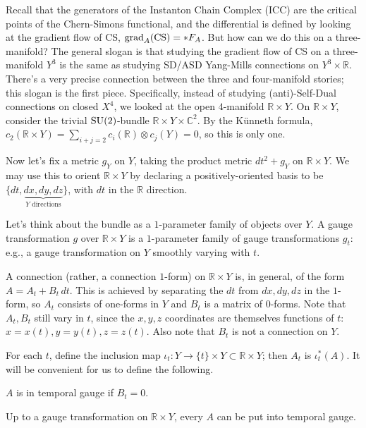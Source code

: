 \documentclass[main]{subfiles}
\begin{document}
Recall that the generators of the Instanton Chain Complex (ICC) are the critical points of the Chern-Simons functional, and the differential is defined by looking at the gradient flow of CS, $\operatorname{grad}_A(\operatorname{CS}) = \ast F_A$. But how can we do this on a three-manifold? The general slogan is that studying the gradient flow of CS on a three-manifold $Y^3$ is the same as studying SD/ASD Yang-Mills connections on $Y^3\times\mathbb{R}$. There's a very precise connection between the three and four-manifold stories; this slogan is the first piece. Specifically, instead of studying (anti)-Self-Dual connections on closed $X^4$, we looked at the open $4$-manifold $\mathbb{R}\times Y$. On $\mathbb{R}\times Y$, consider the trivial $\operatorname{SU}(2)$-bundle $\mathbb{R}\times Y\times \mathbb{C}^2$. By the K\"unneth formula, $c_2(\mathbb{R}\times Y) = \sum_{i+j=2} c_i(\mathbb{R})\otimes c_j(Y) = 0$, so this is only one.

Now let's fix a metric $g_Y$ on $Y$, taking the product metric $dt^2+g_Y$ on $\mathbb{R}\times Y$. We may use this to orient $\mathbb{R}\times Y$ by declaring a positively-oriented basis to be $\{dt,\underbrace{dx,dy,dz}_{Y \text{ directions}}\}$, with $dt$ in the $\mathbb{R}$ direction.

Let's think about the bundle as a $1$-parameter family of objects over $Y$. A gauge transformation $g$ over $\mathbb{R}\times Y$ is a $1$-parameter family of gauge transformations $g_t$: e.g., a gauge transformation on $Y$ smoothly varying with $t$.

A connection (rather, a connection $1$-form) on $\mathbb{R}\times Y$ is, in general, of the form $A = A_t + B_t\, dt$. This is achieved by separating the $dt$ from $dx,dy,dz$ in the $1$-form, so $A_t$ consists of one-forms in $Y$ and $B_t$ is a matrix of $0$-forms. Note that $A_t, B_t$ still vary in $t$, since the $x,y,z$ coordinates are themselves functions of $t$: $x=x(t), y=y(t), z=z(t)$. Also note that $B_t$ is not a connection on $Y$.

For each $t$, define the inclusion map $\iota_t : Y \to \{t\}\times Y \subset \mathbb{R}\times Y$; then $A_t$ is $\iota_t^\ast(A)$. It will be convenient for us to define the following.

\begin{definition}
$A$ is in temporal gauge if $B_t=0$.
\end{definition}

\begin{lemma}
Up to a gauge transformation on $\mathbb{R}\times Y$, every $A$ can be put into temporal gauge.
\end{lemma}
\end{document}
